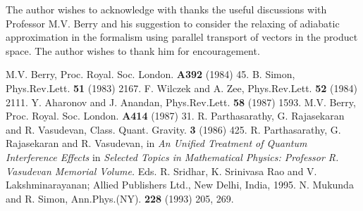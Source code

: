 The author wishes to acknowledge with thanks the useful discussions with Professor M.V. Berry and his suggestion 
to consider the relaxing of adiabatic approximation in the formalism using parallel transport of vectors in the 
product space. The author wishes to thank him for encouragement.  

\begin{thebibliography}{99}
 M.V. Berry, Proc. Royal. Soc. London. {\bf{A392}} (1984) 45.
 B. Simon, Phys.Rev.Lett. {\bf{51}} (1983) 2167.
 F. Wilczek and A. Zee, Phys.Rev.Lett. {\bf{52}} (1984) 2111.
 Y. Aharonov and J. Anandan, Phys.Rev.Lett. {\bf{58}} (1987) 1593.
 M.V. Berry, Proc. Royal. Soc. London. {\bf{A414}} (1987) 31.  
 R. Parthasarathy, G. Rajasekaran and R. Vasudevan, Class. Quant. Gravity. {\bf{3}} (1986) 425.
 R. Parthasarathy, G. Rajasekaran and R. Vasudevan, in {\textit{An Unified Treatment of Quantum Interference Effects}} in \textit{Selected Topics in Mathematical Physics: Professor R. Vasudevan Memorial Volume.} Eds. R. Sridhar, K. Srinivasa Rao and V. Lakshminarayanan; Allied Publishers Ltd., New Delhi, India, 1995.
 N. Mukunda and R. Simon, Ann.Phys.(NY). {\bf{228}} (1993) 205, 269.
\end{thebibliography}








